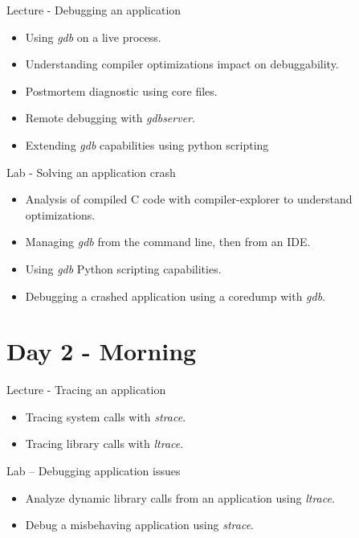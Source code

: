 \documentclass[a4paper,12pt,obeyspaces,spaces,hyphens]{article}
\begin{document}
\feagendatwocolumn
{Lecture - Debugging an application}
{
  \begin{itemize}
  \item Using {\em gdb} on a live process.
  \item Understanding compiler optimizations impact on debuggability.
  \item Postmortem diagnostic using core files.
  \item Remote debugging with {\em gdbserver}.
  \item Extending {\em gdb} capabilities using python scripting
  \end{itemize}
}
{Lab - Solving an application crash}
{
  \begin{itemize}
  \item Analysis of compiled C code with compiler-explorer to understand
    optimizations.
  \item Managing {\em gdb} from the command line, then from an IDE.
  \item Using {\em gdb} Python scripting capabilities.
  \item Debugging a crashed application using a coredump with {\em gdb}.
  \end{itemize}
}

\section{Day 2 - Morning}

\feagendatwocolumn
{Lecture - Tracing an application}
{
  \begin{itemize}
  \item Tracing system calls with {\em strace}.
  \item Tracing library calls with {\em ltrace}.
  \end{itemize}
}
{Lab – Debugging application issues}
{
  \begin{itemize}
  \item Analyze dynamic library calls from an application using
    {\em ltrace}.
  \item Debug a misbehaving application using {\em strace}.
  \end{itemize}
}
\end{document}
